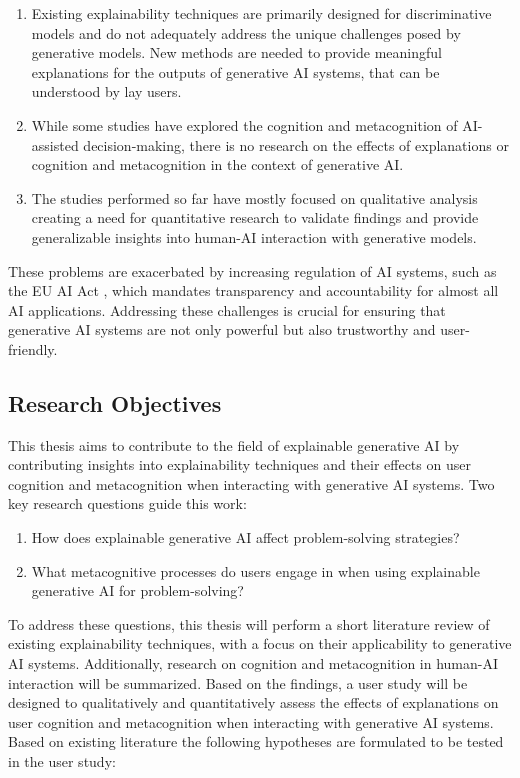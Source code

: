 \begin{enumerate}
    \item Existing explainability techniques are primarily designed for discriminative models and do not adequately address the unique challenges posed by generative models. New methods are needed to provide meaningful explanations for the outputs of generative \ac{AI} systems, that can be understood by lay users.
    \item While some studies have explored the cognition and metacognition of \ac{AI}-assisted decision-making, there is no research on the effects of explanations or cognition and metacognition in the context of generative \ac{AI}.
    \item The studies performed so far have mostly focused on qualitative analysis creating a need for quantitative research to validate findings and provide generalizable insights into human-\ac{AI} interaction with generative models.
\end{enumerate}

These problems are exacerbated by increasing regulation of \ac{AI} systems, such as the \ac{EU} \ac{AI} Act \parencite{EuropeanUnion2024}, which mandates transparency and accountability for almost all \ac{AI} applications. Addressing these challenges is crucial for ensuring that generative \ac{AI} systems are not only powerful but also trustworthy and user-friendly.

\subsection{Research Objectives} \label{subsec:research-objectives}

This thesis aims to contribute to the field of explainable generative \ac{AI} by contributing insights into explainability techniques and their effects on user cognition and metacognition when interacting with generative \ac{AI} systems. Two key research questions guide this work:

\begin{enumerate}[label=(\textbf{RQ\arabic*}),leftmargin=4em]
    \item How does explainable generative \ac{AI} affect problem-solving strategies?
    \item What metacognitive processes do users engage in when using explainable generative \ac{AI} for problem-solving?
\end{enumerate}

To address these questions, this thesis will perform a short literature review of existing explainability techniques, with a focus on their applicability to generative \ac{AI} systems. Additionally, research on cognition and metacognition in human-\ac{AI} interaction will be summarized. Based on the findings, a user study will be designed to qualitatively and quantitatively assess the effects of explanations on user cognition and metacognition when interacting with generative \ac{AI} systems. Based on existing literature the following hypotheses are formulated to be tested in the user study:

